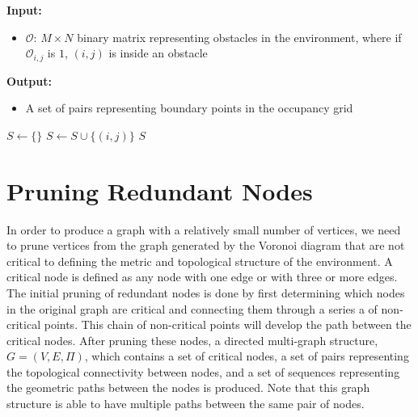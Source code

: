 \documentclass[letterpaper, 10pt, conference]{ieeeconf}
\renewcommand{\algorithmicrequire}{\textbf{Input:}}
\renewcommand{\algorithmicensure}{\textbf{Output:}}
\newcommand{\Function}[1]{\ensuremath{{ \textsc{#1}}}}
\begin{document}
\begin{algorithm}[h!]
    \caption{$\Function{BoundaryPoints}(\mathcal{O})$}
    \algorithmicrequire{
        \begin{itemize}
            \item $\mathcal{O}$: $M \times N$ binary matrix representing
                obstacles in the environment, where if $\mathcal{O}_{i, j}$ is
                $1$, $(i, j)$ is inside an obstacle
        \end{itemize}}
    \algorithmicensure{
        \begin{itemize}
            \item A set of pairs representing boundary points in the
                occupancy grid
        \end{itemize}}

    \label{algo:boundary}
    \begin{algorithmic}[1]
        \setcounter{ALC@line}{0}
        \vspace*{1mm}
        \STATE $S \leftarrow \{\}$
                                \STATE $S \leftarrow S \cup \{(i, j)\}$
                            \ENDIF
                        \ENDFOR
                    \ENDFOR
                \ENDIF
            \ENDFOR
        \ENDFOR
        \RETURN $S$
    \end{algorithmic}
\end{algorithm}

\section{Pruning Redundant Nodes}

\label{sec:prune_nodes}

In order to produce a graph with a relatively small number of vertices, we need
to prune vertices from the graph generated by the Voronoi diagram that are not
critical to defining the metric and topological structure of the environment. A
critical node is defined as any node with one edge or with three or more edges.
The initial pruning of redundant nodes is done by first determining which nodes
in the original graph are critical and connecting them through a series a of
non-critical points.  This chain of non-critical points will develop the path
between the critical nodes.  After pruning these nodes, a directed multi-graph
structure, $G = (V, E, \Pi)$, which contains a set of critical nodes, a set of
pairs representing the topological connectivity between nodes, and a set of
sequences representing the geometric paths between the nodes is produced. Note
that this graph structure is able to have multiple paths between the same pair
of nodes.
\end{document}
